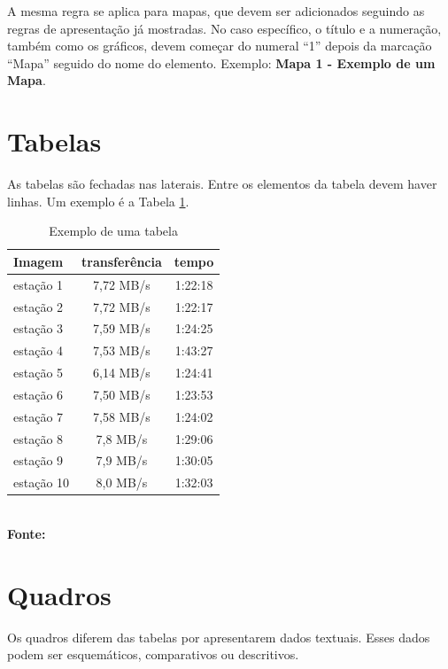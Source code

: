 A mesma regra se aplica para mapas, que devem ser adicionados seguindo as regras de apresentação já mostradas. No caso específico,
o título e a numeração, também como os gráficos, devem começar do numeral ``1'' depois da marcação ``Mapa'' seguido do nome do elemento.
Exemplo: \textbf{Mapa 1 - Exemplo de um Mapa}.

 \section{\esp Tabelas}

As tabelas são fechadas nas laterais. Entre os elementos da tabela devem haver linhas. Um exemplo é a Tabela \ref{tab:tabela1}. 

\begin{table}[htb]
	\centering
	\caption{\hspace{0.1cm} Exemplo de uma tabela}
	\vspace{-0.3cm} %
	\label{tab:tabela1}
	\begin{tabular}{l|c|c}
  \hline
    \textbf{Imagem}	& \textbf{transferência} & \textbf{tempo} \\
    \hline
     estação 1	& 7,72 MB/s &  1:22:18 \\
     estação 2	& 7,72 MB/s &  1:22:17 \\
     estação 3	& 7,59 MB/s & 1:24:25 \\
     estação 4  & 7,53 MB/s & 1:43:27 \\
     estação 5	& 6,14 MB/s  &  1:24:41 \\
     estação 6  &  7,50 MB/s & 1:23:53 \\
     estação 7  & 7,58 MB/s  &  1:24:02 \\
     estação 8  & 7,8 MB/s  &  1:29:06 \\
     estação 9  & 7,9 MB/s  &  1:30:05 \\
     estação 10 & 8,0 MB/s  &  1:32:03 \\
     \hline
 \end{tabular}
	\small
	{\footnotesize\\ \textbf{Fonte: }}
\end{table}

\section{\esp Quadros}

Os quadros diferem das tabelas por apresentarem dados textuais.
Esses dados podem ser esquemáticos, comparativos ou descritivos.

